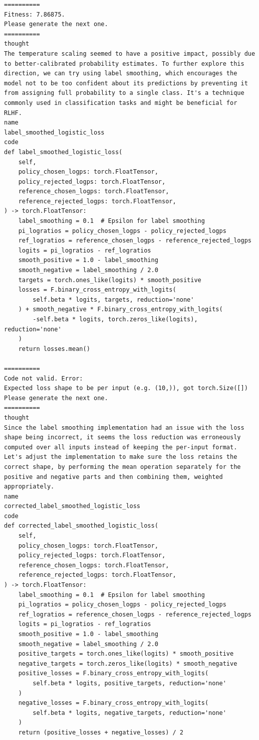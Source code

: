 \documentclass{article}
\theoremstyle{plain}
\theoremstyle{definition}
\theoremstyle{remark}
\begin{document}
\begin{lstlisting}
==========
Fitness: 7.86875.
Please generate the next one.
==========
thought
The temperature scaling seemed to have a positive impact, possibly due to better-calibrated probability estimates. To further explore this direction, we can try using label smoothing, which encourages the model not to be too confident about its predictions by preventing it from assigning full probability to a single class. It's a technique commonly used in classification tasks and might be beneficial for RLHF.
name
label_smoothed_logistic_loss
code
def label_smoothed_logistic_loss(
    self,
    policy_chosen_logps: torch.FloatTensor,
    policy_rejected_logps: torch.FloatTensor,
    reference_chosen_logps: torch.FloatTensor,
    reference_rejected_logps: torch.FloatTensor,
) -> torch.FloatTensor:
    label_smoothing = 0.1  # Epsilon for label smoothing
    pi_logratios = policy_chosen_logps - policy_rejected_logps
    ref_logratios = reference_chosen_logps - reference_rejected_logps
    logits = pi_logratios - ref_logratios
    smooth_positive = 1.0 - label_smoothing
    smooth_negative = label_smoothing / 2.0
    targets = torch.ones_like(logits) * smooth_positive
    losses = F.binary_cross_entropy_with_logits(
        self.beta * logits, targets, reduction='none'
    ) + smooth_negative * F.binary_cross_entropy_with_logits(
        -self.beta * logits, torch.zeros_like(logits), reduction='none'
    )
    return losses.mean()
    
==========
Code not valid. Error:
Expected loss shape to be per input (e.g. (10,)), got torch.Size([])
Please generate the next one.
==========
thought
Since the label smoothing implementation had an issue with the loss shape being incorrect, it seems the loss reduction was erroneously computed over all inputs instead of keeping the per-input format. Let's adjust the implementation to make sure the loss retains the correct shape, by performing the mean operation separately for the positive and negative parts and then combining them, weighted appropriately.
name
corrected_label_smoothed_logistic_loss
code
def corrected_label_smoothed_logistic_loss(
    self,
    policy_chosen_logps: torch.FloatTensor,
    policy_rejected_logps: torch.FloatTensor,
    reference_chosen_logps: torch.FloatTensor,
    reference_rejected_logps: torch.FloatTensor,
) -> torch.FloatTensor:
    label_smoothing = 0.1  # Epsilon for label smoothing
    pi_logratios = policy_chosen_logps - policy_rejected_logps
    ref_logratios = reference_chosen_logps - reference_rejected_logps
    logits = pi_logratios - ref_logratios
    smooth_positive = 1.0 - label_smoothing
    smooth_negative = label_smoothing / 2.0
    positive_targets = torch.ones_like(logits) * smooth_positive
    negative_targets = torch.zeros_like(logits) * smooth_negative
    positive_losses = F.binary_cross_entropy_with_logits(
        self.beta * logits, positive_targets, reduction='none'
    )
    negative_losses = F.binary_cross_entropy_with_logits(
        self.beta * logits, negative_targets, reduction='none'
    )
    return (positive_losses + negative_losses) / 2
    

\end{lstlisting}
\end{document}
